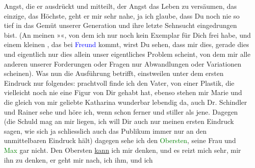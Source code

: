                   Angst, die er ausdrückt und mitteilt, der Angst das Leben zu versäumen, das
                  einzige, das Höchste, geht er mir sehr nahe\label{LL294-1h}, ja ich glaube, dass Du noch
               nie so tief in das Gemüt unserer Generation und ihre letzte Sehnsucht eingedrungen
               bist. (An meinen »\label{K_L01548_2v}\label{K_L01548_2h}«, von
               dem ich nur noch kein Exemplar für Dich frei habe, und einem kleinen \label{K_L01548_3v}\label{K_L01548_3h}, das bei \textcolor{blue}{Freund}{}\ledrightnote{\textcolor{blue}{Fritz Freund}} kommt, wirst
                  \label{LL294-2v}Du sehen, dass mir dies, gerade dies und
                  eigentlich nur dies allein unser eigentliches Problem scheint, von dem mir alle
                  anderen unserer Forderungen oder Fragen nur Abwandlungen oder Variationen
                  scheinen\label{LL294-2h}). Was nun die Ausführung betrifft, einstweilen unter {\pb}dem ersten Eindruck nur folgendes: prachtvoll finde ich den Vater, von einer
               Plastik, die vielleicht noch nie eine Figur von Dir gehabt hat, ebenso stehen mir
               Marie und die gleich von mir geliebte Katharina wunderbar lebendig da, auch Dr.
               Schindler und Rainer sehe und höre ich, wenn schon ferner und stiller als jene.
               Dagegen (die Schuld mag an mir liegen, ich will Dir auch nur meinen ersten Eindruck
               sagen, wie sich ja schliesslich auch das Publikum immer nur an den unmittelbaren
               Eindruck hält) dagegen sehe ich den \textcolor{green}{Obersten}{}, seine Frau und \textcolor{green}{Max}{} gar nicht. Den Obersten \uline{kann} ich mir
               denken, und es reizt mich sehr, mir ihn zu denken, er geht mir nach, ich ihm, und ich
